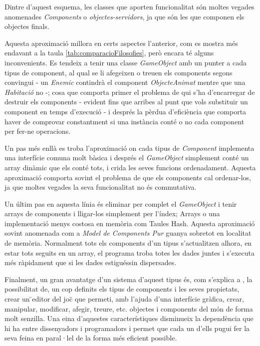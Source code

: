 Dintre d'aquest esquema, les classes que aporten funcionalitat són moltes vegades anomenades {\em Components} o {\em objectes-servidors}, ja que són les que componen els objectes finals.

Aquesta aproximació millora en certs aspectes l'anterior, com es mostra més endavant a la taula \ref{tab:comparacioFilosofies}, però encara té alguns inconvenients. Es tendeix a tenir una classe {\em GameObject} amb un punter a cada tipus de component, al qual se li afegeixen o treuen els components segons convingui - un {\em Enemic} contindrà el component {\em ObjecteAnimat} mentre que una {\em Habitació} no -; cosa que comporta primer el problema de qui s'ha d'encarregar de destruir els components - evident fins que arribes al punt que vols substituir un component en temps d'execució - i després la pèrdua d'eficiència que comporta haver de comprovar constantment si una instància conté o no cada component per fer-ne operacions.

Un pas més enllà es troba l'aproximació on cada tipus de {\em Component} implementa una interfície comuna molt bàsica i després el {\em GameObject} simplement conté un array dinàmic que els conté tots, i crida les seves funcions ordenadament. Aquesta aproximació comporta sovint el problema de que els components cal ordenar-los, ja que moltes vegades la seva funcionalitat no és commutativa.

Un últim pas en aquesta línia és eliminar per complet el {\em GameObject} i tenir arrays de components i lligar-los simplement per l'índex; Arrays o una implementació menys costosa en memòria com Taules Hash. Aquesta aproximació sovint anomenada com a {\em Model de Components Pur} \citep{Martin07} guanya sobretot en localitat de memòria. Normalment tots els components d'un tipus s'actualitzen alhora, en estar tots seguits en un array, el programa troba totes les dades juntes i s'executa més ràpidament que si les dades estiguéssin dispersades.

Finalment, un gran avantatge d'un sistema d'aquest tipus és, com s'explica a \citep{Leonard99}, la possibilitat de, un cop definits els tipus de components i les seves propietats, crear un \"{}editor del joc\"{} que permeti, amb l'ajuda d'una interfície gràfica, crear, manipular, modificar, afegir, treure, etc. objectes i components del món de forma molt senzilla. Una eina d'aquestes característiques disminueix la dependència que hi ha entre dissenyadors i programadors i permet que cada un d'ells pugui fer la seva feina en paral·lel de la forma més eficient possible.

